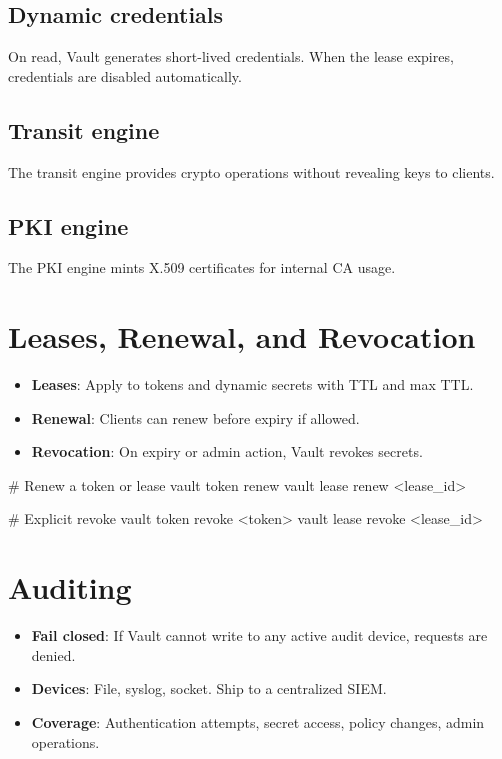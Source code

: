 \documentclass[11pt]{article}
\begin{document}
\subsection{Dynamic credentials}

On read, Vault generates short-lived credentials. When the lease expires, credentials are disabled automatically.

\subsection{Transit engine}

The transit engine provides crypto operations without revealing keys to clients.

\subsection{PKI engine}

The PKI engine mints X.509 certificates for internal CA usage.

\section{Leases, Renewal, and Revocation}

\begin{itemize}
  \item \textbf{Leases}: Apply to tokens and dynamic secrets with TTL and max TTL.
  \item \textbf{Renewal}: Clients can renew before expiry if allowed.
  \item \textbf{Revocation}: On expiry or admin action, Vault revokes secrets.
\end{itemize}

\begin{bashcode}
# Renew a token or lease
vault token renew
vault lease renew <lease_id>

# Explicit revoke
vault token revoke <token>
vault lease revoke <lease_id>
\end{bashcode}

\section{Auditing}

\begin{itemize}
  \item \textbf{Fail closed}: If Vault cannot write to any active audit device, requests are denied.
  \item \textbf{Devices}: File, syslog, socket. Ship to a centralized SIEM.
  \item \textbf{Coverage}: Authentication attempts, secret access, policy changes, admin operations.
\end{itemize}
\end{document}
